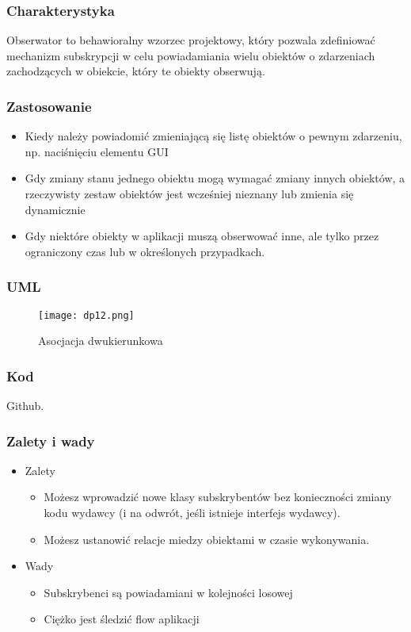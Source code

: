 \documentclass[a4paper,15pt]{article}
\begin{document}
\subsubsection{Charakterystyka}
Obserwator to behawioralny wzorzec projektowy, który pozwala zdefiniować mechanizm subskrypcji
w celu powiadamiania wielu obiektów o zdarzeniach zachodzących w obiekcie, który te obiekty
obserwują.

\subsubsection{Zastosowanie}
\begin{itemize}
\item Kiedy należy powiadomić zmieniającą się listę obiektów o pewnym zdarzeniu, np. naciśnięciu elementu GUI
\item Gdy zmiany stanu jednego obiektu mogą wymagać zmiany innych obiektów, a rzeczywisty zestaw obiektów jest wcześniej nieznany lub zmienia
się dynamicznie
\item Gdy niektóre obiekty w aplikacji muszą obserwować inne, ale tylko przez ograniczony czas lub w określonych przypadkach.
\end{itemize}

\subsubsection{UML}

\begin{figure}[H]
\centering
  \texttt{[image: dp12.png]}
  \caption{Asocjacja dwukierunkowa}
\end{figure}


\subsubsection{Kod}
Github.

\subsubsection{Zalety i wady}
\begin{itemize}
\item Zalety
\begin{itemize}
\item Możesz wprowadzić nowe klasy subskrybentów bez konieczności zmiany kodu wydawcy
(i na odwrót, jeśli istnieje interfejs wydawcy).
\item Możesz ustanowić relacje miedzy obiektami w czasie wykonywania.
\end{itemize}
\item Wady
\begin{itemize}
\item Subskrybenci są powiadamiani w kolejności losowej
\item Ciężko jest śledzić flow aplikacji
\end{itemize}
\end{itemize}
\end{document}
